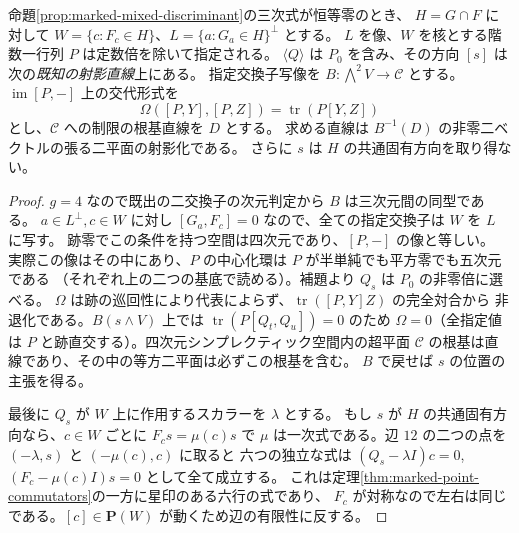 \begin{theorem}\label{thm:marked-commuting-intersection}
命題\ref{prop:marked-mixed-discriminant}の三次式が恒等零のとき、
$H=G\cap F$ に対して $W=\{c:F_c\in H\}$、$L=\{a:G_a\in H\}^\perp$ とする。
$L$ を像、$W$ を核とする階数一行列 $P$ は定数倍を除いて指定される。
$\langle Q\rangle$ は $P_0$ を含み、その方向 $[s]$ は次の\emph{既知の射影直線}上にある。
指定交換子写像を $B:\bigwedge^2V\longrightarrow\mathcal C$ とする。
$\operatorname{im}[P,-]$ 上の交代形式を
\[
      \Omega([P,Y],[P,Z])=\operatorname{tr}(P[Y,Z])
\]
とし、$\mathcal C$ への制限の根基直線を $D$ とする。
求める直線は $B^{-1}(D)$ の非零二ベクトルの張る二平面の射影化である。
さらに $s$ は $H$ の共通固有方向を取り得ない。
\end{theorem}
\begin{proof}
$g=4$ なので既出の二交換子の次元判定から $B$ は三次元間の同型である。
$a\in L^\perp,c\in W$ に対し $[G_a,F_c]=0$ なので、全ての指定交換子は $W$ を $L$ に写す。
跡零でこの条件を持つ空間は四次元であり、$[P,-]$ の像と等しい。
実際この像はその中にあり、$P$ の中心化環は $P$ が半単純でも平方零でも五次元である
（それぞれ上の二つの基底で読める）。補題より $Q_s$ は $P_0$ の非零倍に選べる。
$\Omega$ は跡の巡回性により代表によらず、$\operatorname{tr}([P,Y] Z)$ の完全対合から
非退化である。$B(s\wedge V)$ 上では $\operatorname{tr}(P[Q_t,Q_u])=0$ のため
$\Omega=0$（全指定値は $P$ と跡直交する）。四次元シンプレクティック空間内の超平面
$\mathcal C$ の根基は直線であり、その中の等方二平面は必ずこの根基を含む。
$B$ で戻せば $s$ の位置の主張を得る。

最後に $Q_s$ が $W$ 上に作用するスカラーを $\lambda$ とする。
もし $s$ が $H$ の共通固有方向なら、$c\in W$ ごとに $F_c s=\mu(c)s$ で
$\mu$ は一次式である。辺 $12$ の二つの点を $(-\lambda,s)$ と $(-\mu(c),c)$ に取ると
六つの独立な式は $(Q_s-\lambda I)c=0$, $(F_c-\mu(c)I)s=0$ として全て成立する。
これは定理\ref{thm:marked-point-commutators}の一方に星印のある六行の式であり、
$F_c$ が対称なので左右は同じである。$[c]\in\mathbf P(W)$ が動くため辺の有限性に反する。
\end{proof}

